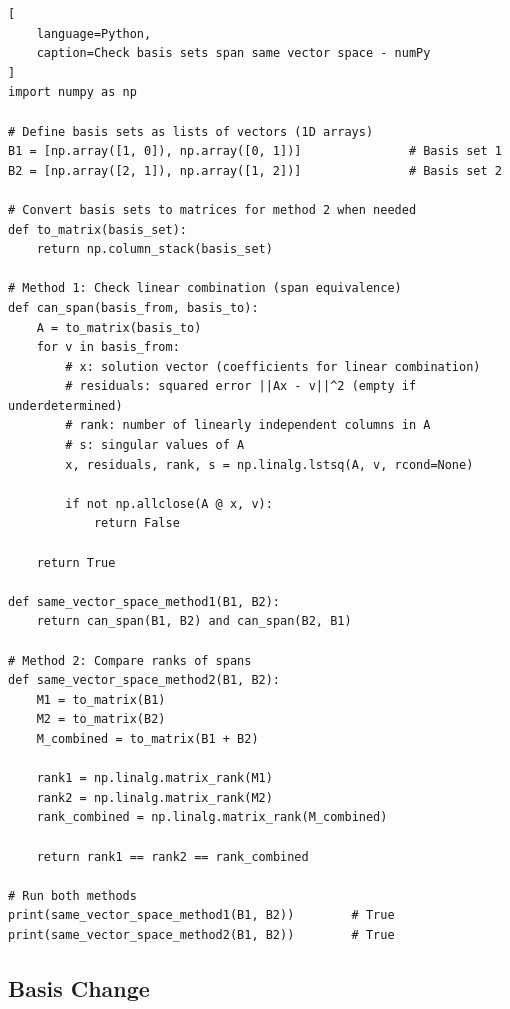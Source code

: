 \begin{lstlisting}[
    language=Python,
    caption=Check basis sets span same vector space - numPy
]
import numpy as np

# Define basis sets as lists of vectors (1D arrays)
B1 = [np.array([1, 0]), np.array([0, 1])]               # Basis set 1
B2 = [np.array([2, 1]), np.array([1, 2])]               # Basis set 2

# Convert basis sets to matrices for method 2 when needed
def to_matrix(basis_set):
    return np.column_stack(basis_set)

# Method 1: Check linear combination (span equivalence)
def can_span(basis_from, basis_to):
    A = to_matrix(basis_to)
    for v in basis_from:
        # x: solution vector (coefficients for linear combination)
        # residuals: squared error ||Ax - v||^2 (empty if underdetermined)
        # rank: number of linearly independent columns in A
        # s: singular values of A
        x, residuals, rank, s = np.linalg.lstsq(A, v, rcond=None)

        if not np.allclose(A @ x, v):
            return False

    return True

def same_vector_space_method1(B1, B2):
    return can_span(B1, B2) and can_span(B2, B1)

# Method 2: Compare ranks of spans
def same_vector_space_method2(B1, B2):
    M1 = to_matrix(B1)
    M2 = to_matrix(B2)
    M_combined = to_matrix(B1 + B2)

    rank1 = np.linalg.matrix_rank(M1)
    rank2 = np.linalg.matrix_rank(M2)
    rank_combined = np.linalg.matrix_rank(M_combined)

    return rank1 == rank2 == rank_combined

# Run both methods
print(same_vector_space_method1(B1, B2))        # True
print(same_vector_space_method2(B1, B2))        # True
\end{lstlisting}





\subsection{Basis Change}

